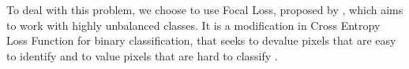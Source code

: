 To deal with this problem, we choose to use Focal Loss, proposed by \cite{Lin:2017}, which aims to work with highly unbalanced classes.
It is a modification in Cross Entropy Loss Function for binary classification, that seeks to devalue pixels that are easy to identify and to value pixels that are hard to classify \cite{Lin:2017}.

% 
% 
% 
% 
% 
% 
% 
% 
% 
% 

